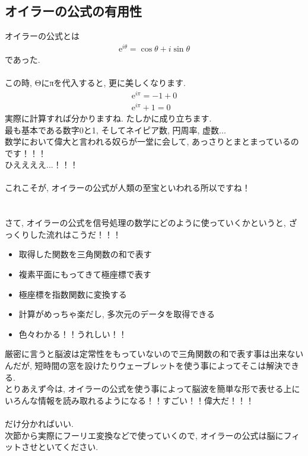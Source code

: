\documentclass[11pt,a4paper]{jreport}
\begin{document}
\subsection{オイラーの公式の有用性}
オイラーの公式とは
\begin{eqnarray}
\mathrm{e}^{i\theta} = \cos \theta + i\sin \theta
\end{eqnarray}
であった.\\
\\
この時, Θにπを代入すると, 更に美しくなります.
\\
\begin{eqnarray}
\mathrm{e}^{i\pi} = -1 + 0\\
\mathrm{e}^{i\pi} + 1 = 0
\end{eqnarray}
実際に計算すれば分かりますね. たしかに成り立ちます. \\
最も基本である数字0と1, そしてネイピア数, 円周率, 虚数...\\
数学において偉大と言われる奴らが一堂に会して, あっさりとまとまっているのです！！！\\
ひええええ...！！！\\
\\
これこそが, オイラーの公式が人類の至宝といわれる所以ですね！\\
\\
\\
さて, オイラーの公式を信号処理の数学にどのように使っていくかというと, ざっくりした流れはこうだ！！！\\
\begin{itemize}
 \item 取得した関数を三角関数の和で表す
 \item 複素平面にもってきて極座標で表す
 \item 極座標を指数関数に変換する
 \item 計算がめっちゃ楽だし, 多次元のデータを取得できる
 \item 色々わかる！！うれしい！！
\end{itemize}
厳密に言うと脳波は定常性をもっていないので三角関数の和で表す事は出来ないんだが, 短時間の窓を設けたりウェーブレットを使う事によってそこは解決できる. \\
とりあえず今は, オイラーの公式を使う事によって脳波を簡単な形で表せる上にいろんな情報を読み取れるようになる！！すごい！！偉大だ！！！\\
\\
だけ分かればいい.\\
次節から実際にフーリエ変換などで使っていくので, オイラーの公式は脳にフィットさせといてください.\\
\end{document}
